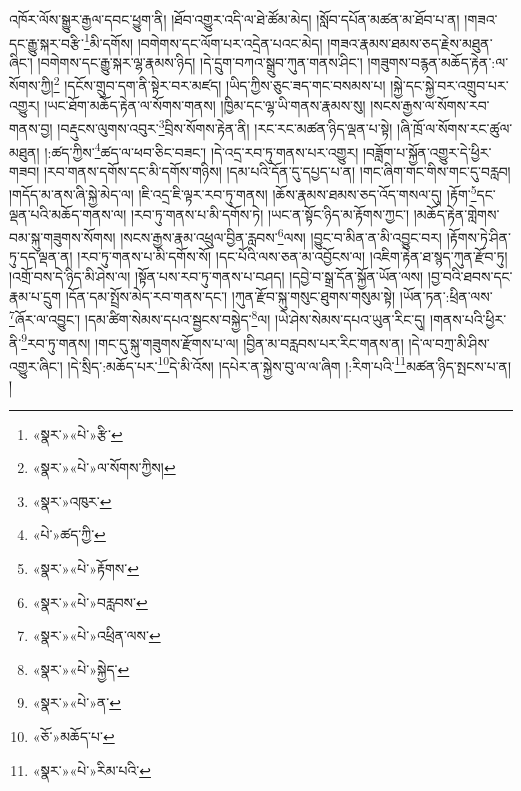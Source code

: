 འཁོར་ལོས་སྒྱུར་རྒྱལ་དབང་ཕྱུག་ནི། །ཐོབ་འགྱུར་འདི་ལ་ཐེ་ཚོམ་མེད། །སློབ་དཔོན་མཚན་མ་ཐོབ་པ་ན། །གཟའ་དང་རྒྱུ་སྐར་བརྩི་\footnote{«སྣར་»«པེ་»རྩི་}མི་དགོས། །བགེགས་དང་ལོག་པར་འདྲེན་པའང་མེད། །གཟའ་རྣམས་ཐམས་ཅད་རྗེས་མཐུན་ཞིང་། །བགེགས་དང་རྒྱུ་སྐར་ལྷ་རྣམས་ཉིད། །དེ་དྲུག་བཀའ་སྒྲུབ་ཀུན་གནས་ཤིང་། །གཟུགས་བརྙན་མཆོད་རྟེན་:ལ་སོགས་ཀྱི།\footnote{«སྣར་»«པེ་»ལ་སོགས་ཀྱིས།} །དངོས་གྲུབ་དག་ནི་སྟེར་བར་མཛད། །ཡིད་ཀྱིས་ཅུང་ཟད་གང་བསམས་པ། །སྐྱེ་དང་སྐྱེ་བར་འགྲུབ་པར་འགྱུར། །ཡང་ཐོག་མཆོད་རྟེན་ལ་སོགས་གནས། །ཁྱིམ་དང་ལྷ་ཡི་གནས་རྣམས་སུ། །སངས་རྒྱས་ལ་སོགས་རབ་གནས་བྱ། །བརྡུངས་ལུགས་འབུར་\footnote{«སྣར་»འཁུར་}བྲིས་སོགས་རྟེན་ནི། །རང་རང་མཚན་ཉིད་ལྡན་པ་སྟེ། །ཞི་ཁྲོ་ལ་སོགས་རང་ཚུལ་མཐུན། །:ཚད་ཀྱིས་\footnote{«པེ་»ཚད་ཀྱི་}ཚད་ལ་ཕབ་ཅིང་བཟང་། །དེ་འདྲ་རབ་ཏུ་གནས་པར་འགྱུར། །བཟློག་པ་སྐྱོན་འགྱུར་དེ་ཕྱིར་གཟབ། །རབ་གནས་དགོས་དང་མི་དགོས་གཉིས། །དམ་པའི་དོན་དུ་དཔྱད་པ་ན། །གང་ཞིག་གང་གིས་གང་དུ་བརླབ། །གདོད་མ་ནས་ཞི་སྐྱེ་མེད་ལ། །ཇི་འདྲ་ཇི་ལྟར་རབ་ཏུ་གནས། །ཆོས་རྣམས་ཐམས་ཅད་འོད་གསལ་དུ། །རྟོག་\footnote{«སྣར་»«པེ་»རྟོགས་}དང་ལྡན་པའི་མཆོད་གནས་ལ། །རབ་ཏུ་གནས་པ་མི་དགོས་ཏེ། །ཡང་ན་སྟོང་ཉིད་མ་རྟོགས་ཀྱང་། །མཆོད་རྟེན་གླེགས་བམ་སྐུ་གཟུགས་སོགས། །སངས་རྒྱས་རྣམ་འཕྲུལ་བྱིན་རླབས་\footnote{«སྣར་»«པེ་»བརླབས་}ལས། །བྱུང་བ་མིན་ན་མི་འབྱུང་བར། །རྟོགས་ཏེ་ཤིན་ཏུ་དད་ལྡན་ན། །རབ་ཏུ་གནས་པ་མི་དགོས་སོ། །དང་པོའི་ལས་ཅན་མ་འབྱོངས་ལ། །འཇིག་རྟེན་ཐ་སྙད་ཀུན་རྫོབ་ཏུ། །འགྲོ་བས་དེ་ཉིད་མི་ཤེས་ལ། །སྟོན་པས་རབ་ཏུ་གནས་པ་བཤད། །དབྱེ་བ་སྒྲ་དོན་སྐྱོན་ཡོན་ལས། །བྱ་བའི་ཐབས་དང་རྣམ་པ་དྲུག །དོན་དམ་སྤྲོས་མེད་རབ་གནས་དང་། །ཀུན་རྫོབ་སྐུ་གསུང་ཐུགས་གསུམ་སྟེ། །ཡོན་ཏན་:ཕྲིན་ལས་\footnote{«སྣར་»«པེ་»འཕྲིན་ལས་}ཞོར་ལ་འབྱུང་། །དམ་ཚིག་སེམས་དཔའ་སྦྱངས་བསྐྱེད་\footnote{«སྣར་»«པེ་»སྐྱེད་}ལ། །ཡེ་ཤེས་སེམས་དཔའ་ཡུན་རིང་དུ། །གནས་པའི་ཕྱིར་ནི་\footnote{«སྣར་»«པེ་»ན་}རབ་ཏུ་གནས། །གང་དུ་སྐུ་གཟུགས་རྫོགས་པ་ལ། །བྱིན་མ་བརླབས་པར་རིང་གནས་ན། །དེ་ལ་བཀྲ་མི་ཤིས་འགྱུར་ཞིང་། །དེ་སྲིད་:མཆོད་པར་\footnote{«ཅོ་»མཆོད་པ་}དེ་མི་འོས། །དཔེར་ན་སྐྱེས་བུ་ལ་ལ་ཞིག །:རིག་པའི་\footnote{«སྣར་»«པེ་»རིམ་པའི་}མཚན་ཉིད་སྤངས་པ་ན། །
